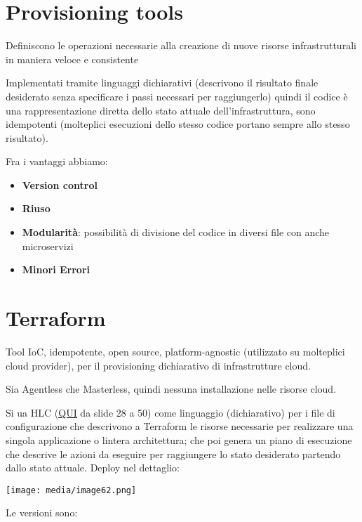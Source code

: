 \section{Provisioning tools}\label{provisioning-tools}

Definiscono le operazioni necessarie alla creazione di nuove risorse
infrastrutturali in maniera veloce e consistente

Implementati tramite linguaggi dichiarativi (descrivono il risultato
finale desiderato senza specificare i passi necessari per raggiungerlo)
quindi il codice è una rappresentazione diretta dello stato attuale
dell'infrastruttura, sono idempotenti (molteplici esecuzioni dello
stesso codice portano sempre allo stesso risultato).

Fra i vantaggi abbiamo:

\begin{itemize}
\item
  \textbf{Version control}
\item
  \textbf{Riuso}
\item
  \textbf{Modularità}: possibilità di divisione del codice in diversi
  file con anche microservizi
\item
  \textbf{Minori Errori}
\end{itemize}

\section{Terraform}\label{terraform}

Tool IoC, idempotente, open source, platform-agnostic (utilizzato su
molteplici cloud provider), per il provisioning dichiarativo di
infrastrutture cloud.

Sia Agentless che Masterless, quindi nessuna installazione nelle risorse
cloud.

Si ua HLC
(\href{https://virtuale.unibo.it/pluginfile.php/2028975/mod_resource/content/1/Lezione\%205\%20-\%20Infrastructure\%20as\%20Code.pdf}{\ul{QUI}}
da slide 28 a 50) come linguaggio (dichiarativo) per i file di
configurazione che descrivono a Terraform le risorse necessarie per
realizzare una singola applicazione o l\textquotesingle intera
architettura; che poi genera un piano di esecuzione che descrive le
azioni da eseguire per raggiungere lo stato desiderato partendo dallo
stato attuale. Deploy nel dettaglio:

\texttt{[image: media/image62.png]}

Le versioni sono:

